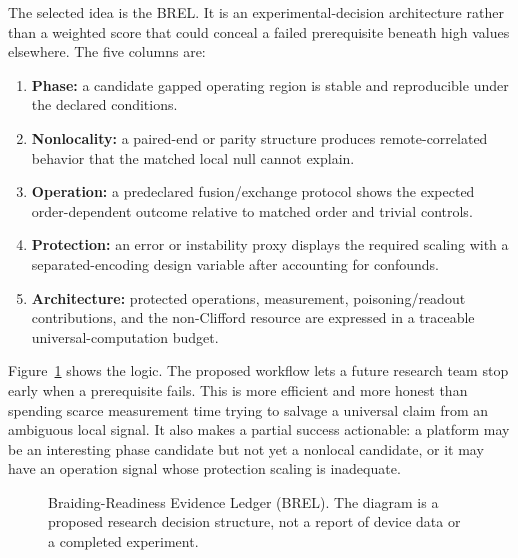 \documentclass[conference]{IEEEtran}
\newcommand{\BREL}{\textsc{BREL}}
\begin{document}
The selected idea is the \BREL. It is an experimental-decision architecture rather than a weighted score that could conceal a failed prerequisite beneath high values elsewhere. The five columns are:
\begin{enumerate}
\item \textbf{Phase:} a candidate gapped operating region is stable and reproducible under the declared conditions.
\item \textbf{Nonlocality:} a paired-end or parity structure produces remote-correlated behavior that the matched local null cannot explain.
\item \textbf{Operation:} a predeclared fusion/exchange protocol shows the expected order-dependent outcome relative to matched order and trivial controls.
\item \textbf{Protection:} an error or instability proxy displays the required scaling with a separated-encoding design variable after accounting for confounds.
\item \textbf{Architecture:} protected operations, measurement, poisoning/readout contributions, and the non-Clifford resource are expressed in a traceable universal-computation budget.
\end{enumerate}

Figure~\ref{fig:brel} shows the logic. The proposed workflow lets a future research team stop early when a prerequisite fails. This is more efficient and more honest than spending scarce measurement time trying to salvage a universal claim from an ambiguous local signal. It also makes a partial success actionable: a platform may be an interesting phase candidate but not yet a nonlocal candidate, or it may have an operation signal whose protection scaling is inadequate.

\begin{figure}[t]
\centering
{}
\caption{Braiding-Readiness Evidence Ledger (BREL). The diagram is a proposed research decision structure, not a report of device data or a completed experiment.}
\label{fig:brel}
\end{figure}
\end{document}
